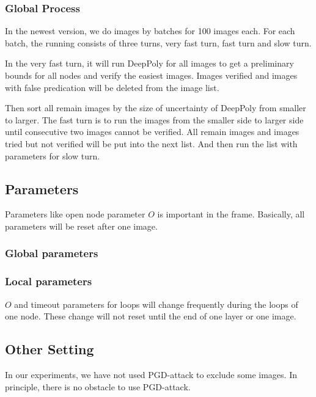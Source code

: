 \documentclass{llncs}
\begin{document}
\subsubsection*{Global Process}

In the newest version, we do images by batches for 100 images each. For each batch, the running consists of three turns, very fast turn, fast turn and slow turn.

In the very fast turn, it will run DeepPoly for all images to get a preliminary bounds for all nodes and verify the easiest images. Images verified and images with false predication will be deleted from the image list.

Then sort all remain images by the size of uncertainty of DeepPoly from smaller to larger. The fast turn is to run the images from the smaller side to larger side until consecutive two images cannot be verified. All remain images and images tried but not verified will be put into the next list. And then run the list with parameters for slow turn.




\subsection{Parameters}

Parameters like open node parameter $O$ is important in the frame. Basically, all parameters will be reset after one image.

\subsubsection*{Global parameters}




\subsubsection*{Local parameters}

$O$ and timeout parameters for loops will change frequently during the loops of one node. These change will not reset until the end of one layer or one image.



\subsection{Other Setting}

In our experiments, we have not used PGD-attack to exclude some images. In principle, there is no obstacle to use PGD-attack.
\fi
\end{document}

